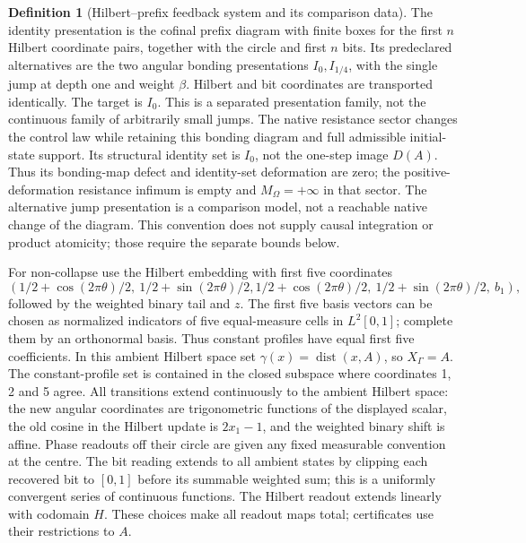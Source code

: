 \documentclass[11pt,a4paper]{article}
\theoremstyle{definition}
\newtheorem{definition}[theorem]{Definition}
\begin{document}
\begin{definition}[Hilbert--prefix feedback system and its comparison data]
The identity presentation is the cofinal prefix diagram with finite boxes for the first $n$ Hilbert coordinate pairs, together with the circle and first $n$ bits. Its predeclared alternatives are the two angular bonding presentations $I_0,I_{1/4}$, with the single jump at depth one and weight $\beta$. Hilbert and bit coordinates are transported identically. The target is $I_0$. This is a separated presentation family, not the continuous family of arbitrarily small jumps.
The native resistance sector changes the control law while retaining this bonding diagram and full admissible initial-state support. Its structural identity set is $I_0$, not the one-step image $D(A)$. Thus its bonding-map defect and identity-set deformation are zero; the positive-deformation resistance infimum is empty and $M_\Omega=+\infty$ in that sector. The alternative jump presentation is a comparison model, not a reachable native change of the diagram. This convention does not supply causal integration or product atomicity; those require the separate bounds below.

For non-collapse use the Hilbert embedding with first five coordinates
\[
 (1/2+\cos(2\pi\theta)/2,\ 1/2+\sin(2\pi\theta)/2,
  1/2+\cos(2\pi\theta)/2,\ 1/2+\sin(2\pi\theta)/2,\ b_1),
\]
followed by the weighted binary tail and $z$. The first five basis vectors can be chosen as normalized indicators of five equal-measure cells in $L^2[0,1]$; complete them by an orthonormal basis. Thus constant profiles have equal first five coefficients. In this ambient Hilbert space set $\gamma(x)=\operatorname{dist}(x,A)$, so $X_\Gamma=A$. The constant-profile set is contained in the closed subspace where coordinates 1, 2 and 5 agree. All transitions extend continuously to the ambient Hilbert space: the new angular coordinates are trigonometric functions of the displayed scalar, the old cosine in the Hilbert update is $2x_1-1$, and the weighted binary shift is affine. Phase readouts off their circle are given any fixed measurable convention at the centre. The bit reading extends to all ambient states by clipping each recovered bit to $[0,1]$ before its summable weighted sum; this is a uniformly convergent series of continuous functions. The Hilbert readout extends linearly with codomain $H$. These choices make all readout maps total; certificates use their restrictions to $A$.


\end{definition}
\end{document}
